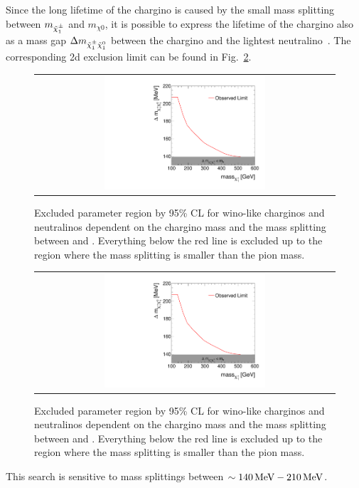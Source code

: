Since the long lifetime of the chargino is caused by the small mass splitting between $m_{\tilde{\chi}^{\pm}_{1}}$ and $m_{\chi0}$, 
it is possible to express the lifetime of the chargino also as a mass gap $\Delta m_{\tilde{\chi}^{\pm}_{1}\tilde{\chi}^{0}_{1}}$ between the chargino and the lightest neutralino~\cite{bib:MassSplitting_Drees}.
The corresponding 2d exclusion limit can be found in Fig.~\ref{fig:DeltaMLimit2d}.
\begin{figure}[!t]
  \centering 
  \begin{tabular}{c}
    \includegraphics[width=0.55\textwidth]{figures/analysis/Interpretation/MassSplittingLimitPlot.pdf} 
  \end{tabular}
  \caption{Excluded parameter region by 95\% CL for wino-like charginos and neutralinos dependent on the chargino mass and the mass splitting between \chipm and \chiO.
           Everything below the red line is excluded up to the region where the mass splitting is smaller than the pion mass.}
  \label{fig:DeltaMLimit2d}
\end{figure} 
\begin{figure}[!t]
  \centering 
  \begin{tabular}{c}
    \includegraphics[width=0.55\textwidth]{figures/analysis/Interpretation/MassSplittingLimitPlot.pdf} 
  \end{tabular}
  \caption{Excluded parameter region by 95\% CL for wino-like charginos and neutralinos dependent on the chargino mass and the mass splitting between \chipm and \chiO.
           Everything below the red line is excluded up to the region where the mass splitting is smaller than the pion mass.}
  \label{fig:DeltaMLimit2d}
\end{figure} 
This search is sensitive to mass splittings between $\sim 140\,\text{Me}\kern-0.06667em\text{V}-210\,\text{Me}\kern-0.06667em\text{V}$.

